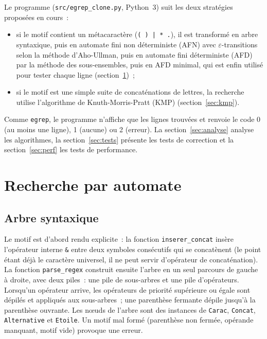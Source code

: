 \documentclass[11pt,a4paper]{article}
\begin{document}
Le programme (\texttt{src/egrep\_clone.py}, Python~3) suit les deux stratégies
proposées en cours~:
\begin{itemize}
  \item si le motif contient un métacaractère (\texttt{( ) | * .}), il est
    transformé en arbre syntaxique, puis en automate fini non déterministe (AFN)
    avec $\varepsilon$-transitions selon la méthode d'Aho-Ullman, puis en
    automate fini déterministe (AFD) par la méthode des sous-ensembles, puis
    en AFD minimal, qui est enfin utilisé pour tester chaque ligne
    (section~\ref{sec:automate})~;
  \item si le motif est une simple suite de concaténations de lettres, la
    recherche utilise l'algorithme de Knuth-Morris-Pratt (KMP)
    (section~\ref{sec:kmp}).
\end{itemize}
Comme \texttt{egrep}, le programme n'affiche que les lignes trouvées et renvoie
le code 0 (au moins une ligne), 1 (aucune) ou 2 (erreur). La
section~\ref{sec:analyse} analyse les algorithmes, la
section~\ref{sec:tests} présente les tests de correction et la
section~\ref{sec:perf} les tests de performance.

\section{Recherche par automate}
\label{sec:automate}

\subsection{Arbre syntaxique}

Le motif est d'abord rendu explicite~: la fonction \texttt{inserer\_concat}
insère l'opérateur interne \texttt{\&} entre deux symboles consécutifs qui se
concatènent (le point étant déjà le caractère universel, il ne peut servir
d'opérateur de concaténation). La fonction \texttt{parse\_regex} construit
ensuite l'arbre en un seul parcours de gauche à droite, avec deux piles~: une
pile de sous-arbres et une pile d'opérateurs. Lorsqu'un opérateur arrive, les
opérateurs de priorité supérieure ou égale sont dépilés et appliqués aux
sous-arbres~; une parenthèse fermante dépile jusqu'à la parenthèse ouvrante.
Les nœuds de l'arbre sont des instances de \texttt{Carac}, \texttt{Concat},
\texttt{Alternative} et \texttt{Etoile}. Un motif mal formé (parenthèse non
fermée, opérande manquant, motif vide) provoque une erreur.
\end{document}
